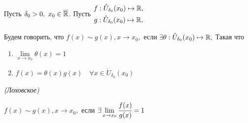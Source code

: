 \begin{definition}
    Пусть $\delta_{0} > 0, \ x_{0} \in \overline{\mathbb{R}}$. Пусть $ \begin{gathered}
        f: \mathring{U}_{\delta_{0}}(x_{0}) \mapsto \mathbb{R}, \\
        g:\mathring{U}_{\delta_{0}}(x_{0}) \mapsto \mathbb{R},
    \end{gathered}$ 
    
    Будем говорить, что $f(x) \sim g(x), x\to x_{0},$ если $\exists \theta :  \mathring{U}_{\delta_{0}}(x_{0}) \mapsto \mathbb{R},$ Такая что \begin{enumerate}
        \item $\lim\limits_{x \to x_{0}} \theta(x)= 1$
        \item $f(x) = \theta(x) g(x) \quad \forall x \in \mathring{U}_{\delta_{0}}(x_{0}) $
    \end{enumerate}
\end{definition}

\begin{definition}
    \textit{(Лоховское)}

    $f(x) \sim g(x), x\to x_{0},$ если $\exists
     \lim\limits_{x \to x_{0}} \cfrac{f(x)}{g(x)} = 1$
\end{definition}

